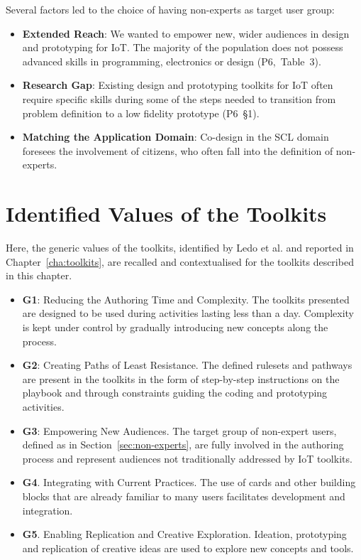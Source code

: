 \pagebreak

Several factors led to the choice of having non-experts as target user group:

\begin{itemize}
    \item \textbf{Extended Reach}: We wanted to empower new, wider audiences in design and prototyping for IoT. The majority of the population does not possess advanced skills in programming, electronics or design (P6,~Table~3).
    \item \textbf{Research Gap}: Existing design and prototyping toolkits for IoT often require specific skills during some of the steps needed to transition from problem definition to a low fidelity prototype (P6~\S1).
    \item \textbf{Matching the Application Domain}: Co-design in the SCL domain foresees the involvement of citizens, who often fall into the definition of non-experts.
\end{itemize}


\section{Identified Values of the Toolkits}

Here, the generic values of the toolkits, identified by Ledo et al. \autocite*{ledo_evaluation_2018} and reported in Chapter~\ref{cha:toolkits}, are recalled and contextualised for the toolkits described in this chapter.

\begin{itemize}
    \item \textbf{G1}: Reducing the Authoring Time and Complexity. The toolkits presented are designed to be used during activities lasting less than a day. Complexity is kept under control by gradually introducing new concepts along the process.
    \item \textbf{G2}: Creating Paths of Least Resistance. The defined rulesets and pathways are present in the toolkits in the form of step-by-step instructions on the playbook and through constraints guiding the coding and prototyping activities.
    \item \textbf{G3}: Empowering New Audiences. The target group of non-expert users, defined as in Section~\ref{sec:non-experts}, are fully involved in the authoring process and represent audiences not traditionally addressed by IoT toolkits.
    \item \textbf{G4}. Integrating with Current Practices. The use of cards and other building blocks that are already familiar to many users facilitates development and integration.
    \item \textbf{G5}. Enabling Replication and Creative Exploration. Ideation, prototyping and replication of creative ideas are used to explore new concepts and tools.
\end{itemize}

